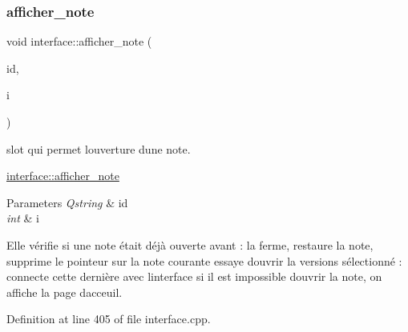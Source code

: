 \subsubsection{\texorpdfstring{afficher\+\_\+note}{afficher\_note}}
{\footnotesize\ttfamily void interface\+::afficher\+\_\+note (\begin{DoxyParamCaption}\item[{Q\+String}]{id,  }\item[{int}]{i }\end{DoxyParamCaption})\hspace{0.3cm}{\ttfamily [slot]}}



slot qui permet l\textquotesingle{}ouverture d\textquotesingle{}une note. 

\hyperlink{classinterface_a320051a7a36aa24f53b12df82649f15f}{interface\+::afficher\+\_\+note} 
\begin{DoxyParams}{Parameters}
{\em Qstring} & id \\
\hline
{\em int} & i\\
\hline
\end{DoxyParams}
Elle vérifie si une note était déjà ouverte avant \+: la ferme, restaure la note, supprime le pointeur sur la note courante essaye d\textquotesingle{}ouvrir la versions sélectionné \+: connecte cette dernière avec l\textquotesingle{}interface si il est impossible d\textquotesingle{}ouvrir la note, on affiche la page d\textquotesingle{}acceuil. 

Definition at line 405 of file interface.\+cpp.

